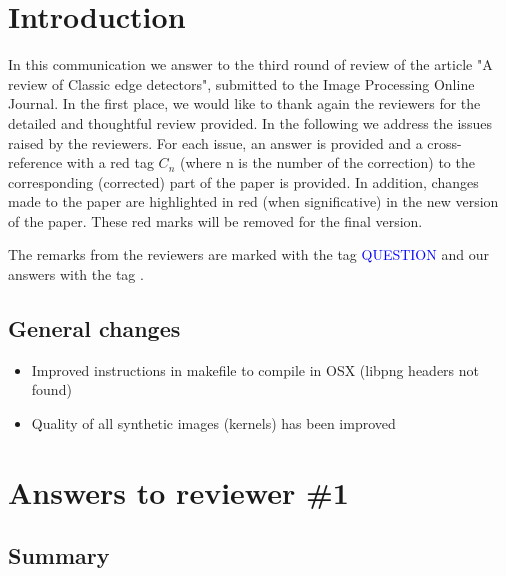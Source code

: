 \documentclass[a4paper,10pt]{report}
\title{}
\author{}
\begin{document}
\maketitle


\chapter{Introduction}
In this communication we answer to the third round of review of the article "A review of Classic edge detectors", submitted to the Image Processing Online Journal.
In the first place, we would like to thank again the reviewers for the detailed and thoughtful review provided. In the following we address the issues raised by the reviewers. For each issue, an answer is provided and a cross-reference with a red tag $C_n$ (where n is the number of the correction) to the corresponding (corrected) part of the paper is provided. In addition, changes made to the paper are highlighted in red (when significative) in the new version of the paper. 
These red marks will be removed for the final version.

The remarks from the reviewers are marked with the tag \textcolor{blue}{QUESTION} and our answers with the tag \ans.

\section{General changes}
\begin{itemize}
 \item Improved instructions in makefile to compile in OSX (libpng headers not found)
 \item Quality of all synthetic images (kernels) has been improved

\end{itemize}


\chapter{Answers to reviewer \#1}

\section{Summary}
\end{document}
